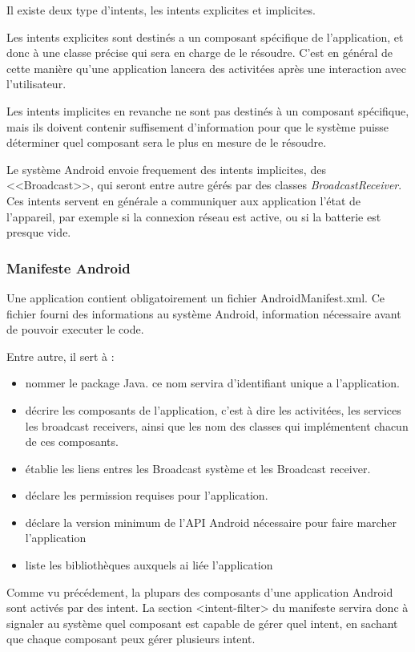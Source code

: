 \documentclass[12pt]{article}
\begin{document}
Il existe deux type d'intents, les intents explicites et implicites.

Les intents explicites sont destinés a un composant spécifique de l'application, et donc à une classe précise qui sera en charge de le résoudre. C'est en général de cette manière qu'une application lancera des activitées après une interaction avec l'utilisateur.

Les intents implicites en revanche ne sont pas destinés à un composant spécifique, mais ils doivent contenir suffisement d'information pour que le système puisse déterminer quel composant sera le plus en mesure de le résoudre.

Le système Android envoie frequement des intents implicites, des <<Broadcast>>, qui seront entre autre gérés par des classes \textit{BroadcastReceiver}. Ces intents servent en générale a communiquer aux application l'état de l'appareil, par exemple si la connexion réseau est active, ou si la batterie est presque vide.

\subsubsection{Manifeste Android}
Une application contient obligatoirement un fichier AndroidManifest.xml. Ce fichier fourni des informations au système Android, information nécessaire avant de pouvoir executer le code.

Entre autre, il sert à :
\begin{itemize}
\item nommer le package Java. ce nom servira d'identifiant unique a l'application.
\item décrire les composants de l'application, c'est à dire les activitées, les services les broadcast receivers, ainsi que les nom des classes qui implémentent chacun de ces composants.
\item établie les liens entres les Broadcast système et les Broadcast receiver.
\item déclare les permission requises pour l'application.
\item déclare la version minimum de l'API Android nécessaire pour faire marcher l'application
\item liste les bibliothèques auxquels ai liée l'application
\end{itemize}

Comme vu précédement, la plupars des composants d'une application Android sont activés par des intent. La section <intent-filter> du manifeste servira donc à signaler au système quel composant est capable de gérer quel intent, en sachant que chaque composant peux gérer plusieurs intent.
\end{document}
